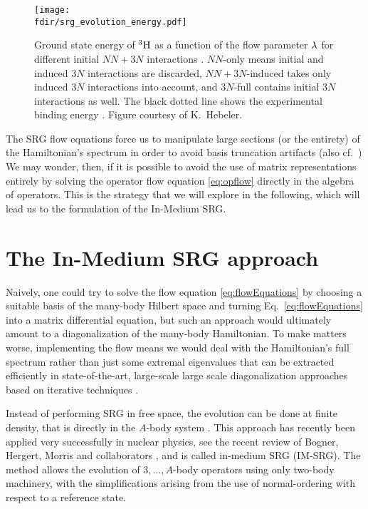 \begin{figure*}[t]
  \setlength{\unitlength}{\textwidth}
  \begin{center}
    \texttt{[image: \\fdir/srg\_evolution\_energy.pdf]}
  \end{center}  
  \caption{\label{fig:triton}Ground state energy of $\nuc{H}{3}$ as a function 
  of the flow parameter $\lambdaSRG$ for different initial \NNLO{} $NN\!+\!3N$ interactions
  \cite{Epelbaum:2002nr,Epelbaum:2006mo}. $NN$-only means initial and 
  induced $3N$ interactions are discarded, $NN\!+\!3N$-induced takes only 
  induced $3N$ interactions into account, and $3N$-full contains initial
  $3N$ interactions as well. The black dotted line shows the experimental 
  binding energy \cite{Wang:2012uq}. Figure courtesy of K.~Hebeler.}
\end{figure*}

The SRG flow equations force us to manipulate large sections (or the 
entirety) of the Hamiltonian's spectrum in order to avoid basis 
truncation artifacts (also cf.~\cite{Roth:2014fk,Binder:2014fk})
We may wonder, then, if it is possible to avoid the use of matrix 
representations entirely by solving the operator flow equation 
\eqref{eq:opflow} directly in the algebra of operators. This is the 
strategy that we will explore in the following, which will 
lead us to the formulation of the In-Medium SRG. 

\section{\label{sec:imsrg}The In-Medium SRG approach}
Naively, one could try to solve the flow equation \eqref{eq:flowEquations} by
choosing a suitable basis of the many-body Hilbert space and turning
Eq.~\eqref{eq:flowEquations} into a matrix differential equation, but such an
approach would ultimately amount to a diagonalization of the many-body
Hamiltonian. To make matters worse, implementing the flow means we
would deal with the Hamiltonian's full spectrum rather than just some
extremal eigenvalues that can be extracted efficiently in
state-of-the-art, large-scale large scale diagonalization approaches based on iterative techniques
\cite{Golub:2013le}.



Instead of performing SRG in free space, the evolution can be done at
finite density, that is directly in the $A$-body system
\cite{Kehrein:2006kx}. This approach has recently been applied very
successfully in nuclear physics, see the recent review of Bogner, Hergert, Morris and collaborators 
\cite{Hergert:2016jk,Hergert:2016ng,Morris:2016xp},
and is called in-medium SRG (IM-SRG). The method allows the evolution
of $3,...,A$-body operators using only two-body machinery, with the
simplifications arising from the use of normal-ordering with respect
to a reference state.

